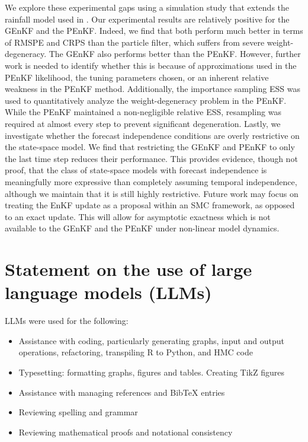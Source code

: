 \documentclass[12pt]{article}
\begin{document}
We explore these experimental gaps using a simulation study that extends the
rainfall model used in \cite{katzfuss2020}.  Our experimental results are
relatively positive for the GEnKF and the PEnKF.  Indeed, we find that both
perform much better in terms of RMSPE and CRPS than the particle filter, which
suffers from severe weight-degeneracy. The GEnKF also performs better than the
PEnKF. However, further work is needed to identify whether this is because of
approximations used in the PEnKF likelihood, the tuning parameters chosen, or an
inherent relative weakness in the PEnKF method. Additionally, the importance
sampling ESS was used to quantitatively analyze the weight-degeneracy problem in
the PEnKF. While the PEnKF maintained a non-negligible relative ESS, 
resampling was required at almost every step to prevent significant
degeneration. Lastly, we investigate whether the forecast independence conditions
are overly restrictive on the state-space model. We find that restricting the
GEnKF and PEnKF to only the last time step reduces their performance. This
provides evidence, though not proof, that the class of state-space models
with forecast independence is meaningfully more expressive than completely
assuming temporal independence, although we maintain that it is still highly
restrictive. Future work may focus on treating the EnKF update as a proposal
within an SMC framework, as opposed to an exact update. This will allow for
asymptotic exactness which is not available to the GEnKF and the PEnKF under
non-linear model dynamics.

\section{Statement on the use of large language models (LLMs)}
LLMs were used for the following:
\begin{itemize}
    \item Assistance with coding, particularly generating graphs, input and output
    operations, refactoring, transpiling R to Python, and HMC code
    \item Typesetting: formatting graphs, figures and tables. Creating TikZ
    figures
    \item Assistance with managing references and BibTeX entries
    \item Reviewing spelling and grammar
    \item Reviewing mathematical proofs and notational consistency
\end{itemize}
\end{document}
